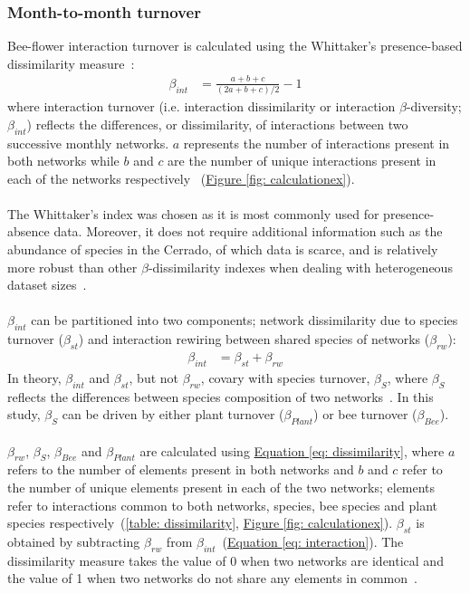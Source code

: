 \documentclass[11pt]{article}
\begin{document}
\subsubsection{Month-to-month turnover}
Bee-flower interaction turnover is calculated using the Whittaker's presence-based dissimilarity measure~\citep{Whittaker1960}: 
\begin{align}
	\beta_{int} & = \frac{a + b + c}{(2a + b + c)/2} - 1 
\label{eq: dissimilarity}
\end{align}
where interaction turnover (i.e. interaction dissimilarity or interaction $\beta$-diversity; $\beta_{int}$) reflects the differences, or dissimilarity, of interactions between two successive monthly networks. $a$ represents the number of interactions present in both networks while $b$ and $c$ are the number of unique interactions present in each of the networks respectively~\citep{Poisot2012} (\hyperref[fig: calculationex]{Figure \ref{fig: calculationex}}). \\
\\
The Whittaker's index was chosen as it is most commonly used for presence-absence data. Moreover, it does not require additional information such as the abundance of species in the Cerrado, of which data is scarce, and is relatively more robust than other $\beta$-dissimilarity indexes when dealing with heterogeneous dataset sizes~\citep{Koleff2003, Poisot2012}. \\
\\
$\beta_{int}$ can be partitioned into two components; network dissimilarity due to species turnover ($\beta_{st}$) and interaction rewiring between shared species of networks ($\beta_{rw}$):
\begin{align}
	\beta_{int} & = \beta_{st} + \beta_{rw} 
\label{eq: interaction}
\end{align}
In theory, $\beta_{int}$ and $\beta_{st}$, but not $\beta_{rw}$, covary with species turnover, $\beta_{S}$, where $\beta_{S}$ reflects the differences between species composition of two networks~\citep{Poisot2012}. In this study, $\beta_{S}$ can be driven by either plant turnover ($\beta_{Plant}$) or bee turnover ($\beta_{Bee}$). \\
\\
$\beta_{rw}$, $\beta_{S}$, $\beta_{Bee}$ and $\beta_{Plant}$ are calculated using \hyperref[eq: dissimilarity]{Equation \ref{eq: dissimilarity}}, where $a$ refers to the number of elements present in both networks and $b$ and $c$ refer to the number of unique elements present in each of the two networks; elements refer to interactions common to both networks, species, bee species and plant species respectively~(\autoref{table: dissimilarity}, \hyperref[fig: calculationex]{Figure \ref{fig: calculationex}}). $\beta_{st}$ is obtained by subtracting $\beta_{rw}$ from $\beta_{int}$~(\hyperref[eq: interaction]{Equation \ref{eq: interaction}}). The dissimilarity measure takes the value of 0 when two networks are identical and the value of 1 when two networks do not share any elements in common~\citep{Poisot2012, CaraDonna2017}. \vspace{0.2cm}
\end{document}
